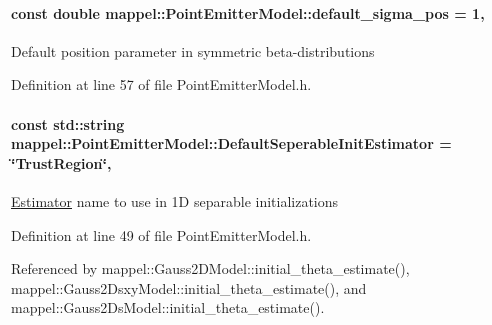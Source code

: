 \paragraph[{\texorpdfstring{default\+\_\+sigma\+\_\+pos}{default_sigma_pos}}]{\setlength{\rightskip}{0pt plus 5cm}const double mappel\+::\+Point\+Emitter\+Model\+::default\+\_\+sigma\+\_\+pos = 1\hspace{0.3cm}{\ttfamily [static]}, {\ttfamily [inherited]}}\hypertarget{classmappel_1_1PointEmitterModel_aa98a73b9e3937c00b07596d3928df3ca}{}\label{classmappel_1_1PointEmitterModel_aa98a73b9e3937c00b07596d3928df3ca}
Default position parameter in symmetric beta-\/distributions 

Definition at line 57 of file Point\+Emitter\+Model.\+h.

\paragraph[{\texorpdfstring{Default\+Seperable\+Init\+Estimator}{DefaultSeperableInitEstimator}}]{\setlength{\rightskip}{0pt plus 5cm}const std\+::string mappel\+::\+Point\+Emitter\+Model\+::\+Default\+Seperable\+Init\+Estimator = \char`\"{}Trust\+Region\char`\"{}\hspace{0.3cm}{\ttfamily [static]}, {\ttfamily [inherited]}}\hypertarget{classmappel_1_1PointEmitterModel_ad8c3dc629d75d22f25855a5f1ba8729f}{}\label{classmappel_1_1PointEmitterModel_ad8c3dc629d75d22f25855a5f1ba8729f}
\hyperlink{classmappel_1_1Estimator}{Estimator} name to use in 1D separable initializations 

Definition at line 49 of file Point\+Emitter\+Model.\+h.



Referenced by mappel\+::\+Gauss2\+D\+Model\+::initial\+\_\+theta\+\_\+estimate(), mappel\+::\+Gauss2\+Dsxy\+Model\+::initial\+\_\+theta\+\_\+estimate(), and mappel\+::\+Gauss2\+Ds\+Model\+::initial\+\_\+theta\+\_\+estimate().

